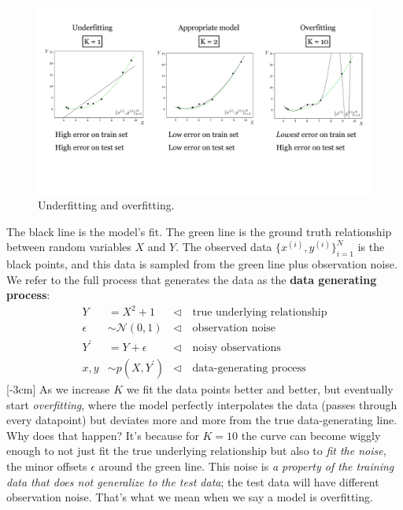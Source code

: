\begin{figure}[h]
    \centerline{
    \includegraphics[width=1.0\linewidth]{./figures/problem_of_generalization/under_and_overfitting.pdf}
    }
    \caption{Underfitting and overfitting.}
    \label{fig:under_and_overfitting}
\end{figure}

The black line is the model's fit. The green line is the ground truth relationship between random variables $X$ and $Y$. The observed data $\{x^{(i)}, y^{(i)}\}_{i=1}^N$ is the black points, and this data is sampled from the green line plus observation noise. We refer to the full process that generates the data as the {\bf data generating process}:
\begin{align}
    Y &= X^2 + 1 &\triangleleft \quad\text{true underlying relationship}\\
    \epsilon &\sim \mathcal{N}(0,1) &\triangleleft \quad\text{observation noise}\\
    Y^\prime &= Y + \epsilon &\triangleleft \quad\text{noisy observations}\\
    x,y &\sim p(X,Y^{\prime}) &\triangleleft \quad\text{data-generating process}
\end{align}[-3cm]
As we increase $K$ we fit the data points better and better, but eventually start \emph{overfitting}, where the model perfectly interpolates the data (passes through every datapoint) but deviates more and more from the true data-generating line. Why does that happen? It's because for $K=10$ the curve can become wiggly enough to not just fit the true underlying relationship but also to \textit{fit the noise}, the minor offsets $\epsilon$ around the green line. This noise is \textit{a property of the training data that does not generalize to the test data}; the test data will have different observation noise. That's what we mean when we say a model is overfitting.

